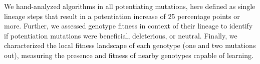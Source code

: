 We hand-analyzed algorithms in all potentiating mutations, here defined as single lineage steps that result in a potentiation increase of 25 percentage points or more.
Further, we assessed genotype fitness in context of their lineage to identify if potentiation mutations were beneficial, deleterious, or neutral. 
Finally, %
we characterized the local fitness landscape of each genotype (one and two mutations out), measuring the presence and fitness of nearby genotypes capable of learning. 




